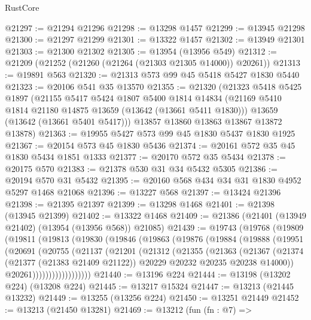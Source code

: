 \begin{lexlean}{RustCore}
\begin{coremodule}
@21297 := @21294 @21296
@21298 := @13298 @1457
@21299 := @13945 @21298
@21300 := @21297 @21299
@21301 := @13322 @1457
@21302 := @13949 @21301
@21303 := @21300 @21302
@21305 := @13954 (@13956 @549)
@21312 := @21209 (@21252 (@21260 (@21264 (@21303 @21305 @14000)) @20261))
@21313 := @19891 @563
@21320 := @21313 @573 @99 @45 @5418 @5427 @1830 @5440
@21323 := @20106 @541 @35 @13570
@21355 := @21320
    (@21323
      @5418
      @5425
      @1897
      (@21155
        @5417
        @5424
        @1807
        @5400
        @1814
        @14834
        (@21169 @5410 @1814 @21180 @14875 @13659 (@13642 (@13661 @5411 @1830)))
        @13659
        (@13642 (@13661 @5401 @5417)))
      @13857
      @13860
      @13863
      @13867
      @13872
      @13878)
@21363 := @19955 @5427 @573 @99 @45 @1830 @5437 @1830 @1925
@21367 := @20154 @573 @45 @1830 @5436
@21374 := @20161 @572 @35 @45 @1830 @5434 @1851 @1333
@21377 := @20170 @572 @35 @5434
@21378 := @20175 @570
@21383 := @21378 @530 @31 @34 @5432 @5305
@21386 := @20194 @570 @31 @5432
@21395 := @20160 @568 @434 @34 @31 @1830 @4952 @5297 @1468 @21068
@21396 := @13227 @568
@21397 := @13424 @21396
@21398 := @21395 @21397
@21399 := @13298 @1468
@21401 := @21398 (@13945 @21399)
@21402 := @13322 @1468
@21409 := @21386 (@21401 (@13949 @21402) (@13954 (@13956 @568)) @21085)
@21439 := @19743
    (@19768
      (@19809
        (@19811
          (@19813
            (@19830
              (@19846
                (@19863
                  (@19876
                    (@19884
                      (@19888
                        (@19951
                          (@20691
                            (@20755
                              (@21137
                                (@21201
                                  (@21312
                                    (@21355
                                      (@21363
                                        (@21367
                                          (@21374
                                            (@21377 (@21383 @21409 @21122))
                                            @20229
                                            @20232
                                            @20235
                                            @20238
                                            @14000))
                                        @20261))))))))))))))))))
@21440 := @13196 @224
@21444 := @13198 (@13202 @224) (@13208 @224)
@21445 := @13217 @15324
@21447 := @13213 (@21445 @13232)
@21449 := @13255 (@13256 @224)
@21450 := @13251 @21449
@21452 := @13213 (@21450 @13281)
@21469 := @13212
    (fun (fn : @7) =>

\end{coremodule}
\end{lexlean}
